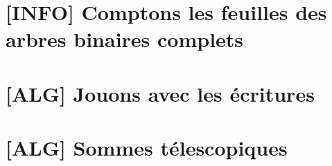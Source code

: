\section{[INFO] Comptons les feuilles des arbres binaires complets} \label{power-2:binary-tree}

	


\newpage
\section{[ALG] Jouons avec les écritures} \label{power-2:rewriting}

	


\newpage
\section{[ALG] Sommes télescopiques} \label{power-2:telescopic}

	
